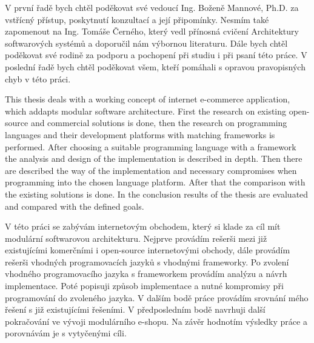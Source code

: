 \documentclass[11pt,twoside,a4paper]{book}
\begin{document}
\acknowledgements
\noindent
V první řadě bych chtěl poděkovat své vedoucí Ing. Boženě Mannové, Ph.D. za vstřícný přístup, poskytnutí konzultací a její připomínky. Nesmím také zapomenout na Ing. Tomáše Černého, který vedl přínosná cvičení Architektury softwarových systémů a doporučil nám výbornou literaturu. Dále bych chtěl poděkovat své rodině za podporu a pochopení při studiu i při psaní této práce. V poslední řadě bych chtěl poděkovat všem, kteří pomáhali s opravou pravopisných chyb v této práci.





 
\abstractpage
This thesis deals with a working concept of internet e-commerce application, which addapts modular software architecture.  First the research on existing open-source and commercial solutions is done, then the research on programming languages and their development platforms with matching frameworks is performed. After choosing a suitable programming language with a framework the analysis and design of the implementation is described in depth. Then there are described the way of the implementation and necessary compromises when programming into the chosen language platform. After that the comparison with the existing solutions is done. In the conclusion results of the thesis are evaluated and compared with the defined goals.



\baselineskip

\noindent
V této práci se zabývám internetovým obchodem, který si klade za cíl mít modulární softwarovou architekturu. Nejprve provádím rešerši mezi již existujícími komerčními i open-source internetovými obchody, dále provádím rešerši vhodných programovacích jazyků s vhodnými frameworky. Po zvolení vhodného programovacího jazyka s frameworkem provádím analýzu a návrh implementace. Poté popisuji způsob implementace a nutné kompromisy při programování do zvoleného jazyka. V dalším bodě práce provádím srovnání mého řešení s již existujícími řešeními. V předposledním bodě navrhuji další pokračování ve vývoji modulárního e-shopu. Na závěr hodnotím výsledky práce a porovnávám je s vytyčenými cíli.
\end{document}
